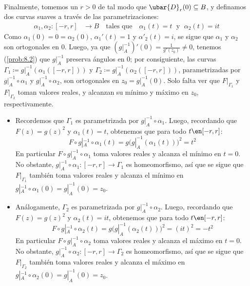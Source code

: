 \begin{sol}
Finalmente, tomemos un $r>0$ de tal modo que $\ubar{D}_r(0) \subseteq B$, y definamos dos curvas suaves a través de las parametrizaciones:
\begin{align*}
\alpha_1,\alpha_2 \colon [-r,r] &\to B
\quad\text{tales que}\quad
\alpha_1(t) = t \;\text{ y }\; \alpha_2(t)= it
\end{align*}
Como $\alpha_1(0) = 0 = \alpha_2(0)$, $\alpha_1'(t) = 1$ y $\alpha'_2(t) = i$, se sigue que $\alpha_1$ y $\alpha_2$ son ortogonales en 0.
Luego, ya que $(g|^{-1}_A)'(0) = \frac{1}{g'(z_0)} \neq 0$, tenemos (\cref{prob:8.2}) que $g|^{-1}_A$ preserva ángulos en $0$; por consiguiente, las curvas $\Gamma_1 \coloneq g|^{-1}_A(\alpha_1([-r,r]))$ y $\Gamma_2 \coloneq g|^{-1}_A(\alpha_2([-r,r]))$, parametrizadas por $g|^{-1}_A \circ \alpha_1$ y $g|^{-1}_A\circ\alpha_2$, son ortogonales en $z_0 = g|^{-1}_A(0)$. Solo falta ver que $F|_{\Gamma_1}$ y $F|_{\Gamma_2}$ toman valores reales, y alcanzan su mínimo y máximo en $z_0$, respectivamente.
\begin{itemize}[leftmargin=1em]
\item Recordemos que $\Gamma_1$ es parametrizada por $g|^{-1}_A\circ\alpha_1$. Luego, recordando que $F(z) = g(z)^2$ y $\alpha_1(t) = t$, obtenemos que para todo $t\en[-r,r]$: 
\[
F \circ  g|^{-1}_A \circ \alpha_1(t) 
= g\bigl(g|^{-1}_A(\alpha_1(t))\bigr)^2
=t^2
\]
En particular $F \circ  g|^{-1}_A \circ \alpha_1$ toma valores reales y alcanza el mínimo en $t=0$. No obstante, $g|^{-1}_A \circ \alpha_1 \colon [-r,r] \to \Gamma_1$ es homeomorfismo, así que se sigue que $F|_{\Gamma_1}$ también toma valores reales y alcanza el mínimo en $g|^{-1}_A \circ \alpha_1(0) = g|^{-1}_A(0)= z_0$.

\item Análogamente, $\Gamma_2$ es parametrizada por $g|^{-1}_A\circ\alpha_2$. Luego, recordando que $F(z) = g(z)^2$ y $\alpha_2(t) = it$, obtenemos que para todo $t\en[-r,r]$: 
\[
F \circ  g|^{-1}_A \circ \alpha_2(t) 
= g\bigl(g|^{-1}_A(\alpha_2(t))\bigr)^2
=(it)^2 = -t^2
\]
En particular $F \circ  g|^{-1}_A \circ \alpha_2$ toma valores reales y alcanza el máximo en $t=0$. No obstante, $g|^{-1}_A \circ \alpha_2\colon [-r,r] \to \Gamma_2$ es homeomorfismo, así que se sigue que $F|_{\Gamma_2}$ también toma valores reales y alcanza el máximo en $g|^{-1}_A \circ \alpha_2(0) = g|^{-1}_A(0)= z_0$.
\end{itemize}
\end{sol}
